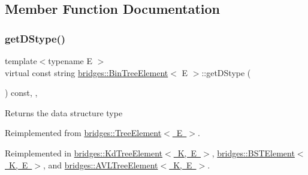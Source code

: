 \subsection{Member Function Documentation}
\mbox{\label{classbridges_1_1_bin_tree_element_a0a154f68ef0a58715e598a6ef92b9e59}} 
\subsubsection{\texorpdfstring{get\+D\+Stype()}{getDStype()}}
{\footnotesize\ttfamily template$<$typename E $>$ \\
virtual const string \mbox{\hyperlink{classbridges_1_1_bin_tree_element}{bridges\+::\+Bin\+Tree\+Element}}$<$ E $>$\+::get\+D\+Stype (\begin{DoxyParamCaption}{ }\end{DoxyParamCaption}) const\hspace{0.3cm}{\ttfamily [inline]}, {\ttfamily [override]}, {\ttfamily [virtual]}}

\begin{DoxyReturn}{Returns}
the data structure type 
\end{DoxyReturn}


Reimplemented from \mbox{\hyperlink{classbridges_1_1_tree_element_a6b264d7391442a742edf96bdd5ee5442}{bridges\+::\+Tree\+Element$<$ E $>$}}.



Reimplemented in \mbox{\hyperlink{classbridges_1_1_kd_tree_element_acdd8f989986b7dd42cfacec73cf52dcb}{bridges\+::\+Kd\+Tree\+Element$<$ K, E $>$}}, \mbox{\hyperlink{classbridges_1_1_b_s_t_element_af3843873c508c24f90b6e73a6f490bf8}{bridges\+::\+B\+S\+T\+Element$<$ K, E $>$}}, and \mbox{\hyperlink{classbridges_1_1_a_v_l_tree_element_a24c005f8e07a7a2682225cead3b7e364}{bridges\+::\+A\+V\+L\+Tree\+Element$<$ K, E $>$}}.

\mbox{\label{classbridges_1_1_bin_tree_element_a8367ce9c4eea814637edc2c56efbde25}} 
